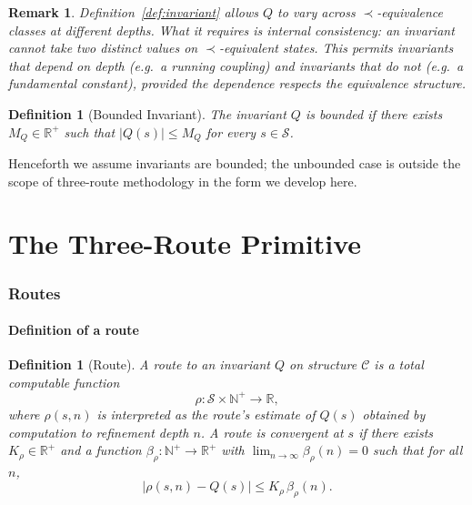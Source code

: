 \documentclass[twocolumn,11pt,a4paper]{article}
\newtheorem{definition}[theorem]{Definition}
\newtheorem{remark}[theorem]{Remark}
\newcommand{\Real}{\mathbb{R}}
\newcommand{\Natural}{\mathbb{N}}
\newcommand{\Inv}{Q}
\newcommand{\Route}{\rho}
\newcommand{\StateS}{\mathcal{S}}
\newcommand{\Depth}{n}
\newcommand{\Tolb}{K}
\begin{document}
\begin{remark}
Definition~\ref{def:invariant} allows $\Inv$ to vary across $\prec$-equivalence classes at different depths. What it requires is internal consistency: an invariant cannot take two distinct values on $\prec$-equivalent states. This permits invariants that depend on depth (e.g.\ a running coupling) and invariants that do not (e.g.\ a fundamental constant), provided the dependence respects the equivalence structure.
\end{remark}

\begin{definition}[Bounded Invariant]
\label{def:bounded-invariant}
The invariant $\Inv$ is \emph{bounded} if there exists $M_{\Inv} \in \Real^+$ such that $|\Inv(s)| \leq M_{\Inv}$ for every $s \in \StateS$.
\end{definition}

Henceforth we assume invariants are bounded; the unbounded case is outside the scope of three-route methodology in the form we develop here.

\part{The Three-Route Primitive}

\section{Routes}
\label{sec:routes}

\subsection{Definition of a route}

\begin{definition}[Route]
\label{def:route}
A \emph{route} to an invariant $\Inv$ on structure $\mathcal{C}$ is a total computable function
\[
\Route : \StateS \times \Natural^+ \to \Real,
\]
where $\Route(s, \Depth)$ is interpreted as the route's estimate of $\Inv(s)$ obtained by computation to refinement depth $\Depth$. A route is \emph{convergent at $s$} if there exists $\Tolb_\Route \in \Real^+$ and a function $\beta_\Route : \Natural^+ \to \Real^+$ with $\lim_{\Depth \to \infty} \beta_\Route(\Depth) = 0$ such that for all $\Depth$,
\[
\bigl|\Route(s, \Depth) - \Inv(s)\bigr| \leq \Tolb_\Route\, \beta_\Route(\Depth).
\]
\end{definition}
\end{document}
